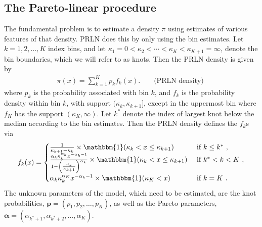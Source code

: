 \documentclass[12pt]{article}
\begin{document}
\subsection{The Pareto-linear procedure}\label{sec:PRLN}
The fundamental problem is to estimate a density $\pi$ using estimates of various features of that density. PRLN does this by only using the bin estimates. Let $k=1,2,\dots,K$ index bins, and let $\kappa_1 = 0 < \kappa_2 < \cdots < \kappa_K < \kappa_{K+1} = \infty$, denote the bin boundaries, which we will refer to as knots. Then the PRLN density is given by
\begin{align}
\pi(x) = \sum_{k=1}^Kp_kf_k(x). && \mbox{ (PRLN density) } \label{eq:density.model}
\end{align}
where $p_k$ is the probability associated with bin $k$, and $f_k$ is the probability density within bin $k$, with support $(\kappa_k, \kappa_{k+1}]$, except in the uppermost bin where $f_K$ has the support $(\kappa_K, \infty)$. Let $k^*$ denote the index of largest knot below the median according to the bin estimates. Then the PRLN density defines the $f_k$s via
\begin{align}
  f_k(x) = \begin{cases}\frac{1}{\kappa_{k+1} - \kappa_k} \times \mathbbm{1}(\kappa_k < x \leq \kappa_{k+1}) & \mbox{ if $k \leq k^*$ },\\
    \frac{\alpha_k\kappa_k^{\alpha_k}x^{-\alpha_k - 1}}{1 - \left(\frac{\kappa_k}{\kappa_{k+1}}\right)^{\alpha_k}} \times \mathbbm{1}(\kappa_k < x \leq \kappa_{k+1}) & \mbox{ if $k^* < k < K$ },\\
    \alpha_k\kappa_k^{\alpha_K}x^{-\alpha_k - 1} \times \mathbbm{1}(\kappa_K < x) & \mbox{ if $k = K$ }.
  \end{cases}\label{eq:prln.density}
\end{align}
The unknown parameters of the model, which need to be estimated, are the knot probabilities, $\bm{p} = (p_1, p_2, \dots, p_K)$, as well as the Pareto parameters, $\bm{\alpha} = (\alpha_{k^* + 1}, \alpha_{k^* + 2}, \dots, \alpha_{K})$.
\end{document}
